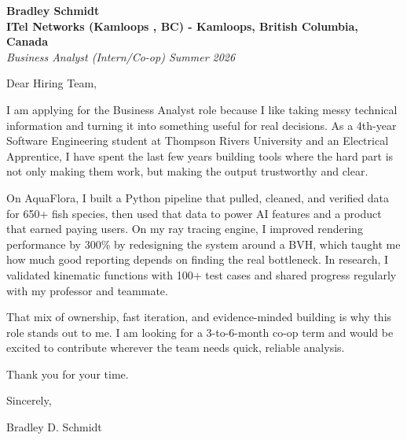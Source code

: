 \documentclass[11pt]{article}
\begin{document}
\textbf{Bradley Schmidt}\\
\vspace{0.5em}
\textbf{ITel Networks (Kamloops , BC) - Kamloops, British Columbia, Canada}\\
\textit{Business Analyst (Intern/Co-op) Summer 2026}

Dear Hiring Team,

\par

I am applying for the Business Analyst role because I like taking messy technical information and turning it into something useful for real decisions. As a 4th-year Software Engineering student at Thompson Rivers University and an Electrical Apprentice, I have spent the last few years building tools where the hard part is not only making them work, but making the output trustworthy and clear.

\par

On AquaFlora, I built a Python pipeline that pulled, cleaned, and verified data for 650+ fish species, then used that data to power AI features and a product that earned paying users. On my ray tracing engine, I improved rendering performance by 300\% by redesigning the system around a BVH, which taught me how much good reporting depends on finding the real bottleneck. In research, I validated kinematic functions with 100+ test cases and shared progress regularly with my professor and teammate.

\par

That mix of ownership, fast iteration, and evidence-minded building is why this role stands out to me. I am looking for a 3-to-6-month co-op term and would be excited to contribute wherever the team needs quick, reliable analysis.

\par

Thank you for your time.

\par

Sincerely,

\par

Bradley D. Schmidt
\end{document}
